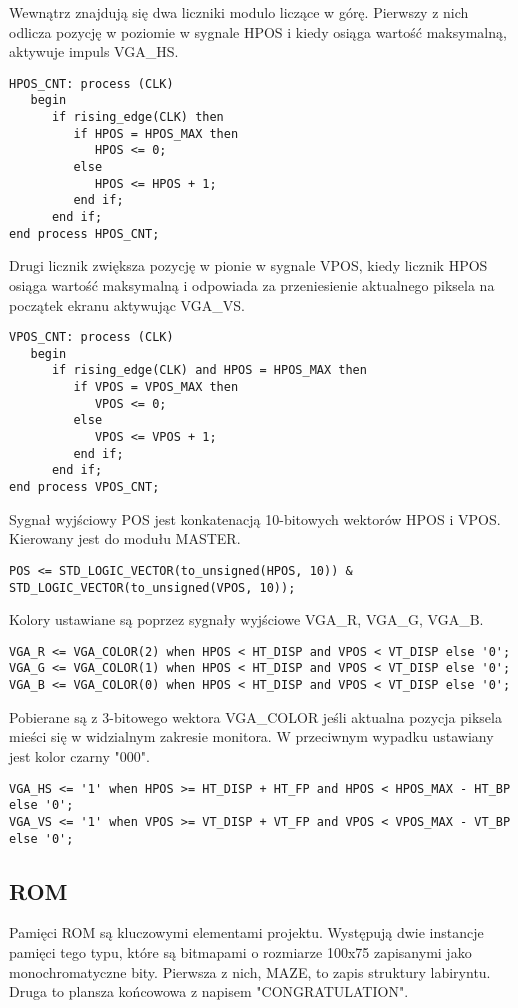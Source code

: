 \documentclass[11pt]{article}
\begin{document}
Wewnątrz znajdują się dwa liczniki modulo liczące w górę.
Pierwszy z nich odlicza pozycję w poziomie w sygnale HPOS i kiedy osiąga wartość maksymalną, aktywuje impuls VGA\_HS.
\begin{lstlisting}
HPOS_CNT: process (CLK) 
   begin
      if rising_edge(CLK) then
         if HPOS = HPOS_MAX then
            HPOS <= 0;
         else
            HPOS <= HPOS + 1;
         end if;
      end if;
end process HPOS_CNT;
\end{lstlisting}
Drugi licznik zwiększa pozycję w pionie w sygnale VPOS, kiedy licznik HPOS osiąga wartość maksymalną i odpowiada za przeniesienie aktualnego piksela na początek ekranu aktywując VGA\_VS.
\begin{lstlisting}
VPOS_CNT: process (CLK) 
   begin
      if rising_edge(CLK) and HPOS = HPOS_MAX then
         if VPOS = VPOS_MAX then
            VPOS <= 0;
         else
            VPOS <= VPOS + 1;
         end if;
      end if;
end process VPOS_CNT;
\end{lstlisting}

Sygnał wyjściowy POS jest konkatenacją 10-bitowych wektorów HPOS i VPOS. 
Kierowany jest do modułu MASTER.
\begin{lstlisting}
POS <= STD_LOGIC_VECTOR(to_unsigned(HPOS, 10)) & STD_LOGIC_VECTOR(to_unsigned(VPOS, 10));
\end{lstlisting}


Kolory ustawiane są poprzez sygnały wyjściowe VGA\_R, VGA\_G, VGA\_B.
\begin{lstlisting}
VGA_R <= VGA_COLOR(2) when HPOS < HT_DISP and VPOS < VT_DISP else '0';
VGA_G <= VGA_COLOR(1) when HPOS < HT_DISP and VPOS < VT_DISP else '0';
VGA_B <= VGA_COLOR(0) when HPOS < HT_DISP and VPOS < VT_DISP else '0';
\end{lstlisting}
Pobierane są z 3-bitowego wektora VGA\_COLOR jeśli aktualna pozycja piksela mieści się w widzialnym zakresie monitora.
W przeciwnym wypadku ustawiany jest kolor czarny "000".
\begin{lstlisting}
VGA_HS <= '1' when HPOS >= HT_DISP + HT_FP and HPOS < HPOS_MAX - HT_BP else '0';
VGA_VS <= '1' when VPOS >= VT_DISP + VT_FP and VPOS < VPOS_MAX - VT_BP else '0';
\end{lstlisting}

\subsection{ROM}

Pamięci ROM są kluczowymi elementami projektu. Występują dwie instancje pamięci tego typu, które są bitmapami o rozmiarze 100x75 zapisanymi jako monochromatyczne bity.
Pierwsza z nich, MAZE, to zapis struktury labiryntu.
Druga to plansza końcowowa z napisem "CONGRATULATION".
\end{document}
